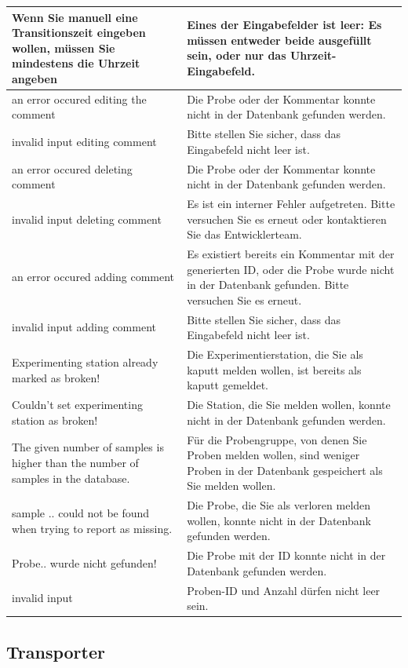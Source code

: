 \documentclass[enabledeprecatedfontcommands,fontsize=12pt,paper=a4,twoside]{scrartcl}
\begin{document}
\begin{longtable}[c]{|p{5cm}|p{10cm}|}
Wenn Sie manuell eine Transitionszeit eingeben wollen, müssen Sie mindestens die Uhrzeit angeben & Eines der Eingabefelder ist leer: Es müssen entweder beide ausgefüllt sein, oder nur das Uhrzeit-Eingabefeld. \\ \hline
an error occured editing the comment & Die Probe oder der Kommentar konnte nicht in der Datenbank gefunden werden. \\ \hline
invalid input editing comment & Bitte stellen Sie sicher, dass das Eingabefeld nicht leer ist. \\ \hline
an error occured deleting comment & Die Probe oder der Kommentar konnte nicht in der Datenbank gefunden werden. \\ \hline
invalid input deleting comment & Es ist ein interner Fehler aufgetreten. Bitte versuchen Sie es erneut oder kontaktieren Sie das Entwicklerteam. \\ \hline
an error occured adding comment & Es existiert bereits ein Kommentar mit der generierten ID, oder die Probe wurde nicht in der Datenbank gefunden. Bitte versuchen Sie es erneut. \\ \hline
invalid input adding comment & Bitte stellen Sie sicher, dass das Eingabefeld nicht leer ist. \\ \hline
Experimenting station already marked as broken! & Die Experimentierstation, die Sie als kaputt melden wollen, ist bereits als kaputt gemeldet. \\ \hline
Couldn't set experimenting station as broken! & Die Station, die Sie melden wollen, konnte nicht in der Datenbank gefunden werden. \\ \hline
The given number of samples is higher than the number of samples in the database. &  Für die Probengruppe, von denen Sie Proben melden wollen, sind weniger Proben in der Datenbank gespeichert als Sie melden wollen. \\ \hline
sample .. could not be found when trying to report as missing. & Die Probe, die Sie als verloren melden wollen, konnte nicht in der Datenbank gefunden werden. \\ \hline
Probe.. wurde nicht gefunden! & Die Probe mit der ID konnte nicht in der Datenbank gefunden werden. \\ \hline
invalid input& Proben-ID und Anzahl dürfen nicht leer sein. \\ \hline
\end{longtable}
\subsection{Transporter}
\end{document}
